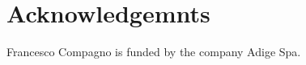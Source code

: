 \documentclass[sw]{iosart2x}
\begin{document}


\section*{Acknowledgemnts}


Francesco Compagno is funded
by the company Adige Spa.





%
\end{document}
